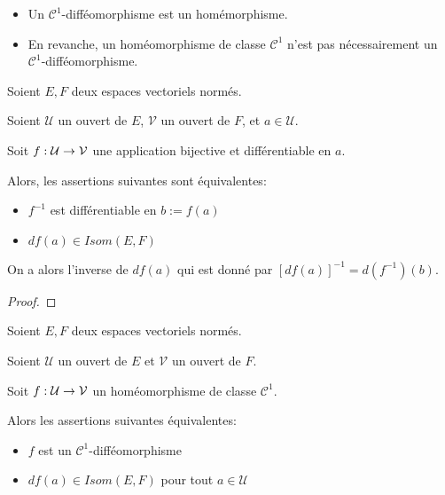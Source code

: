 \begin{remarque}
	\begin{itemize}
		\item Un $\mathcal{C}^{1}$-difféomorphisme est un homémorphisme.
		\item En revanche, un homéomorphisme de classe $\mathcal{C}^{1}$ n'est
			pas nécessairement un $\mathcal{C}^{1}$-difféomorphisme.
	\end{itemize}
\end{remarque}

\begin{proposition}
	Soient $E, F$ deux espaces vectoriels normés.

	Soient $\mathcal{U}$ un ouvert de $E$, $\mathcal{V}$ un ouvert de $F$, et
	$a \in \mathcal{U}$.

	Soit $f : \mathcal{U} \rightarrow \mathcal{V}$ une application bijective et
	différentiable en $a$.

	Alors, les assertions suivantes sont équivalentes:

	\begin{itemize}
		\item $f^{-1}$ est différentiable en $b := f(a)$
		\item $df(a) \in Isom(E, F)$
	\end{itemize}

	On a alors l'inverse de $df(a)$ qui est donné par $[{df(a)}]^{-1} =
	d(f^{-1})(b)$.
\end{proposition}

\ifdefined\outputproof
\begin{proof}

\end{proof}
\fi

\begin{proposition}
	\label{prop:homeo_diffeo_ssi_dfx_isom}
	Soient $E, F$ deux espaces vectoriels normés.

	Soient $\mathcal{U}$ un ouvert de $E$ et $\mathcal{V}$ un ouvert de $F$.

	Soit $f : \mathcal{U} \rightarrow \mathcal{V}$ un homéomorphisme de classe
	$\mathcal{C}^{1}$.

	Alors les assertions suivantes équivalentes:

	\begin{itemize}
		\item $f$ est un $\mathcal{C}^{1}$-difféomorphisme
		\item $df(a) \in Isom(E, F)$ pour tout $a \in \mathcal{U}$
	\end{itemize}
\end{proposition}

